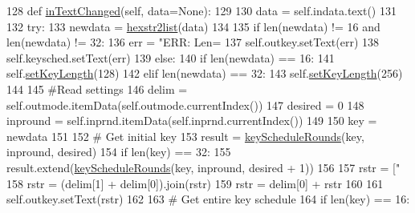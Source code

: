 \begin{DoxyCode}
128     \textcolor{keyword}{def }\hyperlink{classsoftware_1_1chipwhisperer_1_1common_1_1ui_1_1KeyScheduleDialog_1_1KeyScheduleDialog_ac2575bc805f4fd64d0aeb4b4e7558e3d}{inTextChanged}(self, data=None):
129 
130         data = self.indata.text()
131 
132         \textcolor{keywordflow}{try}:
133             newdata = \hyperlink{namespacesoftware_1_1chipwhisperer_1_1common_1_1utils_1_1util_ad2cd7abc81938c0de013778a8044d187}{hexstr2list}(data)
134 
135             \textcolor{keywordflow}{if} len(newdata) != 16 \textcolor{keywordflow}{and} len(newdata) != 32:
136                 err = \textcolor{stringliteral}{"ERR: Len=%
137                 self.outkey.setText(err)
138                 self.keysched.setText(err)
139             \textcolor{keywordflow}{else}:
140                 \textcolor{keywordflow}{if} len(newdata) == 16:
141                     self.\hyperlink{classsoftware_1_1chipwhisperer_1_1common_1_1ui_1_1KeyScheduleDialog_1_1KeyScheduleDialog_a5e76fb8372319d20427cbf8e1101a897}{setKeyLength}(128)
142                 \textcolor{keywordflow}{elif} len(newdata) == 32:
143                     self.\hyperlink{classsoftware_1_1chipwhisperer_1_1common_1_1ui_1_1KeyScheduleDialog_1_1KeyScheduleDialog_a5e76fb8372319d20427cbf8e1101a897}{setKeyLength}(256)
144 
145                 \textcolor{comment}{#Read settings}
146                 delim = self.outmode.itemData(self.outmode.currentIndex())
147                 desired = 0
148                 inpround = self.inprnd.itemData(self.inprnd.currentIndex())
149 
150                 key = newdata
151 
152                 \textcolor{comment}{# Get initial key}
153                 result = \hyperlink{namespacesoftware_1_1chipwhisperer_1_1analyzer_1_1models_1_1aes_1_1key__schedule_aa0e0cef2bfba47599cd9fdaed40e4c5c}{keyScheduleRounds}(key, inpround, desired)
154                 \textcolor{keywordflow}{if} len(key) == 32:
155                     result.extend(\hyperlink{namespacesoftware_1_1chipwhisperer_1_1analyzer_1_1models_1_1aes_1_1key__schedule_aa0e0cef2bfba47599cd9fdaed40e4c5c}{keyScheduleRounds}(key, inpround, desired + 1))
156 
157                 rstr = [\textcolor{stringliteral}{"%
158                 rstr = (delim[1] + delim[0]).join(rstr)
159                 rstr = delim[0] + rstr
160 
161                 self.outkey.setText(rstr)
162 
163                 \textcolor{comment}{# Get entire key schedule}
164                 \textcolor{keywordflow}{if} len(key) == 16:
}}
\end{DoxyCode}
